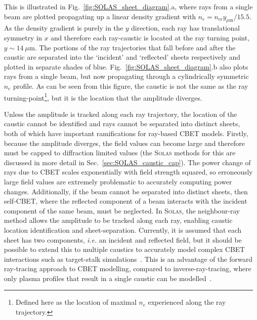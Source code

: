 This is illustrated in Fig.~\ref{fig:SOLAS_sheet_diagram}.a, where rays from a single beam are plotted propagating up a linear density gradient with $n_e=n_{\text{cr}}y_{\mu\text{m}}/15.5$.
As the density gradient is purely in the $y$ direction, each ray has translational symmetry in $x$ and therefore each ray-caustic is located at the ray turning point, $y\sim14\ \mu\text{m}$.
The portions of the ray trajectories that fall before and after the caustic are separated into the `incident' and `reflected' sheets respectively and plotted in separate shades of blue.
Fig.~\ref{fig:SOLAS_sheet_diagram}.b also plots rays from a single beam, but now propagating through a cylindrically symmetric $n_e$ profile.
As can be seen from this figure, the caustic is not the same as the ray turning-point\footnote{Defined here as the location of maximal $n_e$ experienced along the ray trajectory.}, but it is the location that the amplitude diverges.

Unless the amplitude is tracked along each ray trajectory, the location of the caustic cannot be identified and rays cannot be separated into distinct sheets, both of which have important ramifications for ray-based \ac{CBET} models.
Firstly, because the amplitude diverges, the field values can become large and therefore must be capped to diffraction limited values (the \textsc{Solas} methods for this are discussed in more detail in Sec.~\ref{sec:SOLAS_caustic_cap}).
The power change of rays due to \ac{CBET} scales exponentially with field strength squared, so erroneously large field values are extremely problematic to accurately computing power changes.
Additionally, if the beam cannot be separated into distinct sheets, then self-\ac{CBET}, where the reflected component of a beam interacts with the incident component of the same beam, must be neglected.
In \textsc{Solas}, the neighbour-ray method allows the amplitude to be tracked along each ray, enabling caustic location identification and sheet-separation.
Currently, it is assumed that each sheet has two components, \textit{i.e.} an incident and reflected field, but it should be possible to extend this to multiple caustics to accurately model complex \ac{CBET} interactions such as target-stalk simulations~\cite{igumenshchev_effects_2009,igumenshchev_three-dimensional_2016,gatu_johnson_impact_2020}.
This is an advantage of the forward ray-tracing approach to \ac{CBET} modelling, compared to inverse-ray-tracing, where only plasma profiles that result in a single caustic can be modelled~\cite{colaitis_inverse_2021}.

